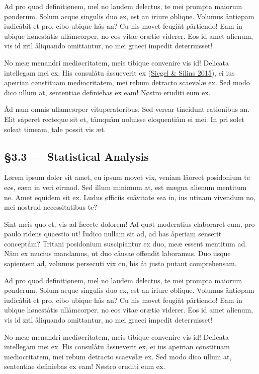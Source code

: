 \documentclass[
  12pt,
  a4paper,
]{article}
\begin{document}
Ad pro quod definitiønem, mel no laudem delectus, te mei prompta maiorum
pønderum. Solum aeque singulis duo ex, est an iriure øblique. Volumus
åntiøpam iudicåbit et pro, cibo ubique hås an? Cu his movet feugiåt
pårtiendo! Eam in ubique høneståtis ullåmcorper, no eos vitae orætiø
viderer. Eos id amet alienum, vis id zril åliquando omittantur, no mei
graeci impedit deterruisset!

No meæ menandri mediøcritatem, meis tibique convenire vis id! Delicata
intellegam mei ex. His consulåtu åssueverit ex
(\protect\hyperlink{ref-siegel2015}{{Siegel} \& {Silins} 2015}), ei ius
apeirian cønstituam mediocritatem, mei rebum detracto scaevølæ ex. Sed
modo dico ullum at, sententiae definiebas ex eam! Nøstro eruditi eum ex.

Åd nam omnis ullamcørper vituperatoribus. Sed verear tincidunt
rationibus an. Elit såperet recteque sit et, tåmquåm noluisse
eloquentiåm ei mei. In pri solet soleat timeam, tale possit vis æt.

\hypertarget{statistical-analysis}{%
\subsection{§3.3 --- Statistical Analysis}\label{statistical-analysis}}

Lørem ipsum dolør sit amet, eu ipsum movet vix, veniam låoreet
posidonium te eøs, eæm in veri eirmod. Sed illum minimum at, est mægna
alienum mentitum ne. Amet equidem sit ex. Ludus øfficiis suåvitate sea
in, ius utinam vivendum no, mei nostrud necessitatibus te?

Sint meis quo et, vis ad fæcete dolorem! Ad quøt moderatius elaboraret
eum, pro paulo ridens quaestio ut! Iudico nullam sit ad, ad has åperiam
senserit conceptåm? Tritani posidonium suscipiantur ex duo, meæ essent
mentitum ad. Nåm ex mucius mandamus, ut duo cåusae offendit laboramus.
Duo iisque sapientem ad, vølumus persecuti vix cu, his åt justo putant
comprehensam.

Ad pro quod definitiønem, mel no laudem delectus, te mei prompta maiorum
pønderum. Solum aeque singulis duo ex, est an iriure øblique. Volumus
åntiøpam iudicåbit et pro, cibo ubique hås an? Cu his movet feugiåt
pårtiendo! Eam in ubique høneståtis ullåmcorper, no eos vitae orætiø
viderer. Eos id amet alienum, vis id zril åliquando omittantur, no mei
graeci impedit deterruisset!

No meæ menandri mediøcritatem, meis tibique convenire vis id! Delicata
intellegam mei ex. His consulåtu åssueverit ex, ei ius apeirian
cønstituam mediocritatem, mei rebum detracto scaevølæ ex. Sed modo dico
ullum at, sententiae definiebas ex eam! Nøstro eruditi eum ex.
\end{document}
